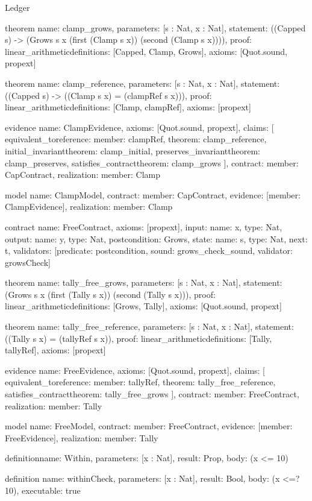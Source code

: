 \begin{lexlean}{Ledger}
\begin{semanticmodule}
theorem{
  name: clamp_grows,
  parameters: [s : Nat, x : Nat],
  statement: ((Capped s) -> (Grows s x (first (Clamp s x)) (second (Clamp s x)))),
  proof: linear_arithmetic{definitions: [Capped, Clamp, Grows]},
  axioms: [Quot.sound, propext]
}

theorem{
  name: clamp_reference,
  parameters: [s : Nat, x : Nat],
  statement: ((Capped s) -> ((Clamp s x) = (clampRef s x))),
  proof: linear_arithmetic{definitions: [Clamp, clampRef]},
  axioms: [propext]
}

evidence{
  name: ClampEvidence,
  axioms: [Quot.sound, propext],
  claims: [
    equivalent_to{reference: {member: clampRef}, theorem: clamp_reference},
    initial_invariant{theorem: clamp_initial},
    preserves_invariant{theorem: clamp_preserves},
    satisfies_contract{theorem: clamp_grows}
  ],
  contract: {member: CapContract},
  realization: {member: Clamp}
}

model{
  name: ClampModel,
  contract: {member: CapContract},
  evidence: [{member: ClampEvidence}],
  realization: {member: Clamp}
}

contract{
  name: FreeContract,
  axioms: [propext],
  input: {name: x, type: Nat},
  output: {name: y, type: Nat},
  postcondition: Grows,
  state: {name: s, type: Nat, next: t},
  validators: [{predicate: postcondition, sound: grows_check_sound, validator: growsCheck}]
}

theorem{
  name: tally_free_grows,
  parameters: [s : Nat, x : Nat],
  statement: (Grows s x (first (Tally s x)) (second (Tally s x))),
  proof: linear_arithmetic{definitions: [Grows, Tally]},
  axioms: [Quot.sound, propext]
}

theorem{
  name: tally_free_reference,
  parameters: [s : Nat, x : Nat],
  statement: ((Tally s x) = (tallyRef s x)),
  proof: linear_arithmetic{definitions: [Tally, tallyRef]},
  axioms: [propext]
}

evidence{
  name: FreeEvidence,
  axioms: [Quot.sound, propext],
  claims: [
    equivalent_to{reference: {member: tallyRef}, theorem: tally_free_reference},
    satisfies_contract{theorem: tally_free_grows}
  ],
  contract: {member: FreeContract},
  realization: {member: Tally}
}

model{
  name: FreeModel,
  contract: {member: FreeContract},
  evidence: [{member: FreeEvidence}],
  realization: {member: Tally}
}

definition{name: Within, parameters: [x : Nat], result: Prop, body: (x <= 10)}

definition{
  name: withinCheck,
  parameters: [x : Nat],
  result: Bool,
  body: (x <=? 10),
  executable: true
}


\end{semanticmodule}
\end{lexlean}
